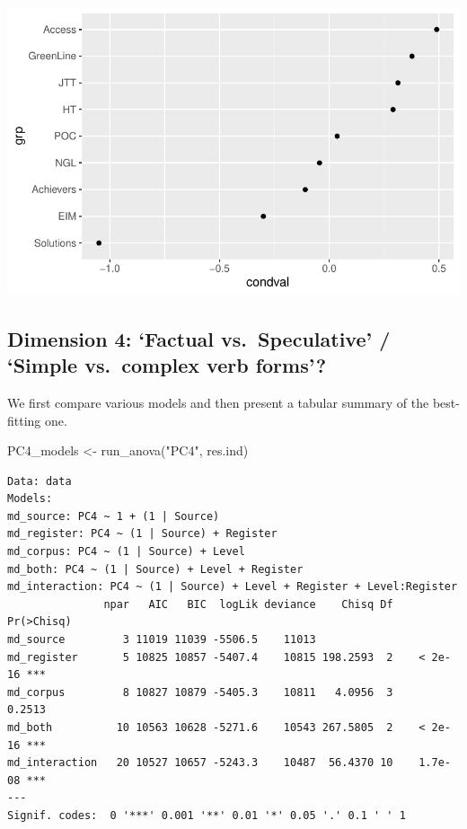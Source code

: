 \documentclass[
  letterpaper,
  DIV=11,
  numbers=noendperiod]{scrreprt}
\newenvironment{Shaded}{\begin{snugshade}}{\end{snugshade}}
\newcommand{\FunctionTok}[1]{\textcolor[rgb]{0.28,0.35,0.67}{#1}}
\newcommand{\NormalTok}[1]{\textcolor[rgb]{0.00,0.23,0.31}{#1}}
\newcommand{\OtherTok}[1]{\textcolor[rgb]{0.00,0.23,0.31}{#1}}
\newcommand{\StringTok}[1]{\textcolor[rgb]{0.13,0.47,0.30}{#1}}
\begin{document}
\includegraphics{G_Ch7_Analysis_files/figure-pdf/unnamed-chunk-17-2.pdf}

\subsection{Dimension 4: `Factual vs.~Speculative' / `Simple vs.~complex
verb
forms'?}\label{dimension-4-factual-vs.-speculative-simple-vs.-complex-verb-forms}

We first compare various models and then present a tabular summary of
the best-fitting one.

\begin{Shaded}
\begin{Highlighting}[]
\NormalTok{PC4\_models }\OtherTok{\textless{}{-}} \FunctionTok{run\_anova}\NormalTok{(}\StringTok{"PC4"}\NormalTok{, res.ind)}
\end{Highlighting}
\end{Shaded}

\begin{verbatim}
Data: data
Models:
md_source: PC4 ~ 1 + (1 | Source)
md_register: PC4 ~ (1 | Source) + Register
md_corpus: PC4 ~ (1 | Source) + Level
md_both: PC4 ~ (1 | Source) + Level + Register
md_interaction: PC4 ~ (1 | Source) + Level + Register + Level:Register
               npar   AIC   BIC  logLik deviance    Chisq Df Pr(>Chisq)    
md_source         3 11019 11039 -5506.5    11013                           
md_register       5 10825 10857 -5407.4    10815 198.2593  2    < 2e-16 ***
md_corpus         8 10827 10879 -5405.3    10811   4.0956  3     0.2513    
md_both          10 10563 10628 -5271.6    10543 267.5805  2    < 2e-16 ***
md_interaction   20 10527 10657 -5243.3    10487  56.4370 10    1.7e-08 ***
---
Signif. codes:  0 '***' 0.001 '**' 0.01 '*' 0.05 '.' 0.1 ' ' 1
\end{verbatim}
\end{document}
